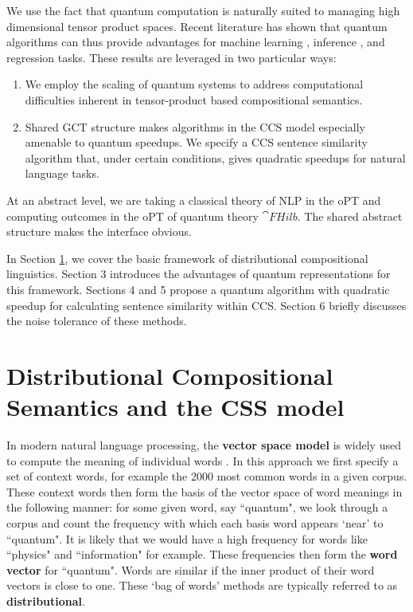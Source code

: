We use the fact that quantum computation is naturally suited to managing high dimensional tensor product spaces. Recent literature has shown that quantum algorithms can thus provide advantages for machine learning \cite{wiebe2014quantum,rebentrost2014quantum}, inference \cite{low2014quantum}, and regression \cite{wiebe2012quantum,wang2014quantum} tasks.  These results are leveraged in two particular ways:
\begin{enumerate}
\item We employ the scaling of quantum systems to address computational difficulties  inherent in tensor-product based compositional semantics.
\item Shared GCT structure makes algorithms in the CCS model especially amenable to quantum speedups.  We specify a CCS sentence similarity algorithm that, under certain conditions, gives quadratic speedups for natural language tasks.
\end{enumerate}
At an abstract level, we are taking a classical theory of NLP in the oPT  and computing outcomes in the oPT of quantum theory $\cat{FHilb}$. The shared abstract structure makes the interface obvious.

In Section \ref{sec:disco}, we cover the basic framework of distributional compositional linguistics. Section 3 introduces the advantages of quantum representations for this framework.  Sections 4 and 5 propose a quantum algorithm with quadratic speedup for calculating sentence similarity within CCS. Section 6 briefly discusses the noise tolerance of these methods.

\section{Distributional Compositional Semantics and the CSS model}
\label{sec:disco}
In modern natural language processing, the \textbf{vector space model} is widely used to compute the meaning of individual words \cite{schutze1998automatic}. In this approach we first specify a set of context words, for example the 2000 most common words in a given corpus.  These context words then form the basis of the vector space of word meanings in the following manner: for some given word, say  ``quantum", we look through a corpus and count the frequency with which each basis word    appears `near' to ``quantum". It is likely that we would have a high frequency for words like ``physics" and ``information" for example.  These frequencies then form the \textbf{word vector} for ``quantum". Words are similar if the inner product of their word vectors is close to one. These `bag of words' methods are typically referred to as \textbf{distributional}.

